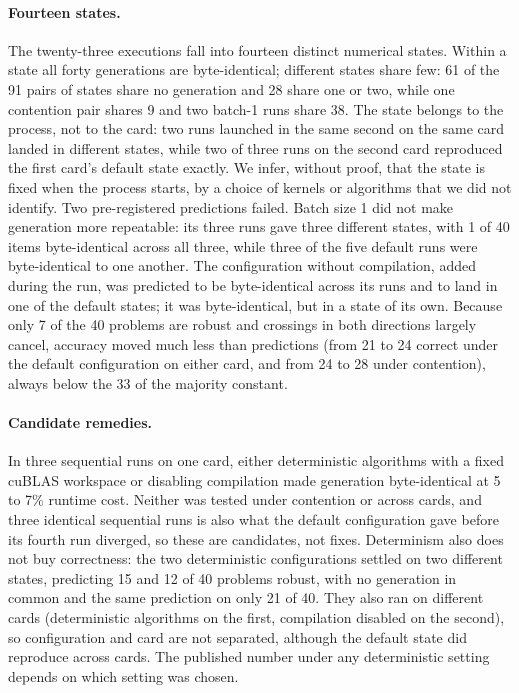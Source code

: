 \paragraph{Fourteen states.}
The twenty-three executions fall into fourteen distinct numerical states. Within a state all forty generations are byte-identical; different states share few: 61 of the 91 pairs of states share no generation and 28 share one or two, while one contention pair shares 9 and two batch-1 runs share 38. The state belongs to the process, not to the card: two runs launched in the same second on the same card landed in different states, while two of three runs on the second card reproduced the first card's default state exactly. We infer, without proof, that the state is fixed when the process starts, by a choice of kernels or algorithms that we did not identify. Two pre-registered predictions failed. Batch size 1 did not make generation more repeatable: its three runs gave three different states, with 1 of 40 items byte-identical across all three, while three of the five default runs were byte-identical to one another. The configuration without compilation, added during the run, was predicted to be byte-identical across its runs and to land in one of the default states; it was byte-identical, but in a state of its own. Because only 7 of the 40 problems are robust and crossings in both directions largely cancel, accuracy moved much less than predictions (from 21 to 24 correct under the default configuration on either card, and from 24 to 28 under contention), always below the 33 of the majority constant.

\paragraph{Candidate remedies.}
In three sequential runs on one card, either deterministic algorithms with a fixed cuBLAS workspace or disabling compilation made generation byte-identical at 5 to 7\% runtime cost. Neither was tested under contention or across cards, and three identical sequential runs is also what the default configuration gave before its fourth run diverged, so these are candidates, not fixes. Determinism also does not buy correctness: the two deterministic configurations settled on two different states, predicting 15 and 12 of 40 problems robust, with no generation in common and the same prediction on only 21 of 40. They also ran on different cards (deterministic algorithms on the first, compilation disabled on the second), so configuration and card are not separated, although the default state did reproduce across cards. The published number under any deterministic setting depends on which setting was chosen.

